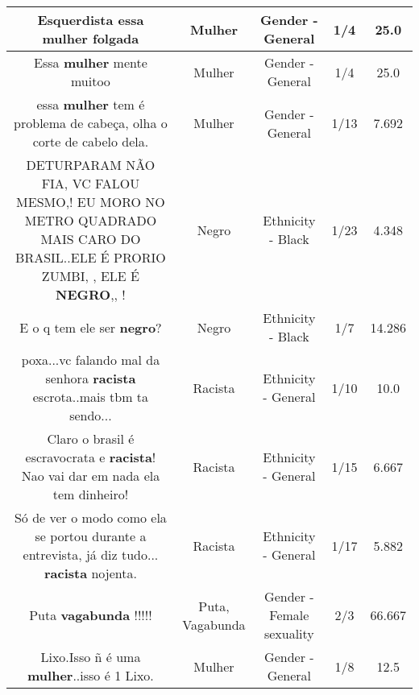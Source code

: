 \documentclass[11pt]{article}
\newlength\mylength
\begin{document}
\begin{center}
\begin{longtable}{|C{.65\mylength}|C{.30\mylength}|C{.12\mylength}|C{.12\mylength}|C{.12\mylength}|}
  \small Esquerdista essa \textbf{mulher} folgada\normalsize   & Mulher & Gender - General & 1/4 & 25.0 \\  \hline
  \small Essa \textbf{mulher} mente muitoo\normalsize   & Mulher & Gender - General & 1/4 & 25.0 \\  \hline
  \small essa \textbf{mulher} tem é problema de cabeça, olha o corte de cabelo dela.\normalsize   & Mulher & Gender - General & 1/13 & 7.692 \\  \hline
  \small DETURPARAM NÃO FIA,  VC FALOU MESMO,!   EU MORO NO METRO QUADRADO MAIS CARO DO BRASIL..ELE É PRORIO ZUMBI, , ELE É \textbf{NEGRO},,  !\normalsize   & Negro & Ethnicity - Black & 1/23 & 4.348 \\  \hline
  \small E o q tem ele ser \textbf{negro}?\normalsize   & Negro & Ethnicity - Black & 1/7 & 14.286 \\  \hline
  \small poxa...vc falando mal da senhora \textbf{racista} escrota..mais tbm ta sendo...\normalsize   & Racista & Ethnicity - General & 1/10 & 10.0 \\  \hline
  \small Claro o brasil é escravocrata e \textbf{racista}! Nao vai dar em nada ela tem dinheiro!\normalsize   & Racista & Ethnicity - General & 1/15 & 6.667 \\  \hline
  \small Só de ver o modo como ela se portou durante a entrevista, já diz tudo... \textbf{racista} nojenta.\normalsize   & Racista & Ethnicity - General & 1/17 & 5.882 \\  \hline
  \small Puta \textbf{vagabunda} !!!!!\normalsize   & Puta, Vagabunda & Gender - Female sexuality & 2/3 & 66.667 \\  \hline
  \small Lixo.Isso ñ é uma \textbf{mulher}..isso é 1 Lixo.\normalsize   & Mulher & Gender - General & 1/8 & 12.5 \\  \hline

\end{longtable}
\end{center}
\end{document}
